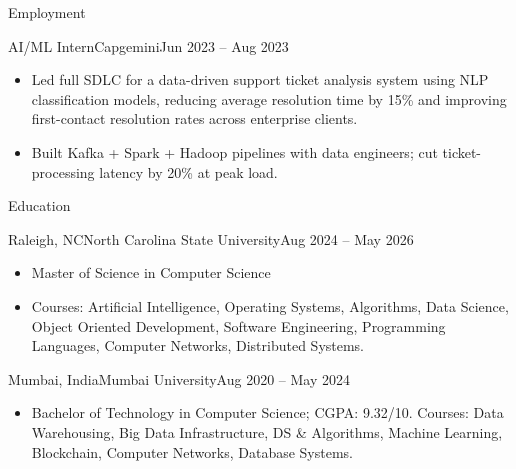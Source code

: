 \documentclass[]{mcdowellcv}
\begin{document}
\begin{cvsection}{Employment}
  \begin{cvsubsection}{AI/ML Intern}{Capgemini}{Jun 2023 -- Aug 2023}
    \begin{itemize}
      \item Led full SDLC for a data-driven support ticket analysis system using NLP classification models, reducing average resolution time by 15\% and improving first-contact resolution rates across enterprise clients.
      \item Built Kafka + Spark + Hadoop pipelines with data engineers; cut ticket-processing latency by 20\% at peak load.
    \end{itemize}
    \vspace{-1.5pt}
  \end{cvsubsection}
\end{cvsection}

\begin{cvsection}{Education}
  \begin{cvsubsection}{Raleigh, NC}{North Carolina State University}{Aug 2024 -- May 2026}
    \begin{itemize}
      \item Master of Science in Computer Science
      \item Courses: Artificial Intelligence, Operating Systems, Algorithms, Data Science, Object Oriented Development, Software Engineering, Programming Languages, Computer Networks, Distributed Systems.
    \end{itemize}
    \vspace{-1.5pt}
  \end{cvsubsection}

  \begin{cvsubsection}{Mumbai, India}{Mumbai University}{Aug 2020 -- May 2024}
    \begin{itemize}
      \item Bachelor of Technology in Computer Science; CGPA: 9.32/10. Courses: Data Warehousing, Big Data Infrastructure, DS \& Algorithms, Machine Learning, Blockchain, Computer Networks, Database Systems.
    \end{itemize}
    \vspace{-1.5pt}
  \end{cvsubsection}
\end{cvsection}
\end{document}
